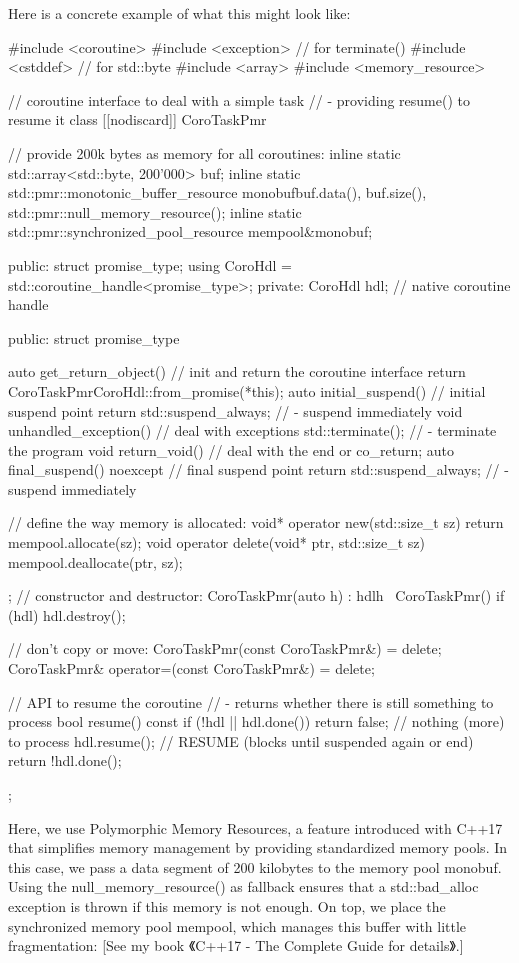 Here is a concrete example of what this might look like:


\begin{cpp}
#include <coroutine>
#include <exception> // for terminate()
#include <cstddef> // for std::byte
#include <array>
#include <memory_resource>

// coroutine interface to deal with a simple task
// - providing resume() to resume it
class [[nodiscard]] CoroTaskPmr {
	// provide 200k bytes as memory for all coroutines:
	inline static std::array<std::byte, 200'000> buf;
	inline static std::pmr::monotonic_buffer_resource
		monobuf{buf.data(), buf.size(), std::pmr::null_memory_resource()};
	inline static std::pmr::synchronized_pool_resource mempool{&monobuf};

public:
	struct promise_type;
	using CoroHdl = std::coroutine_handle<promise_type>;
private:
	CoroHdl hdl; // native coroutine handle
	
public:
	struct promise_type {
		auto get_return_object() { // init and return the coroutine interface
			return CoroTaskPmr{CoroHdl::from_promise(*this)};
		}
		auto initial_suspend() { // initial suspend point
			return std::suspend_always{}; // - suspend immediately
		}
		void unhandled_exception() { // deal with exceptions
			std::terminate(); // - terminate the program
		}
		void return_void() { // deal with the end or co_return;
		}
		auto final_suspend() noexcept { // final suspend point
			return std::suspend_always{}; // - suspend immediately
		}
		
		// define the way memory is allocated:
		void* operator new(std::size_t sz) {
			return mempool.allocate(sz);
		}
		void operator delete(void* ptr, std::size_t sz) {
			mempool.deallocate(ptr, sz);
		}
	};
	// constructor and destructor:
	CoroTaskPmr(auto h) : hdl{h} { }
	~CoroTaskPmr() { if (hdl) hdl.destroy(); }
	
	// don’t copy or move:
	CoroTaskPmr(const CoroTaskPmr&) = delete;
	CoroTaskPmr& operator=(const CoroTaskPmr&) = delete;
	
	// API to resume the coroutine
	// - returns whether there is still something to process
	bool resume() const {
		if (!hdl || hdl.done()) {
			return false; // nothing (more) to process
		}
		hdl.resume(); // RESUME (blocks until suspended again or end)
		return !hdl.done();
	}
};
\end{cpp}

Here, we use Polymorphic Memory Resources, a feature introduced with C++17 that simplifies memory management by providing standardized memory pools. In this case, we pass a data segment of 200 kilobytes to the memory pool monobuf. Using the null\_memory\_resource() as fallback ensures that a std::bad\_alloc exception is thrown if this memory is not enough. On top, we place the synchronized memory pool mempool, which manages this buffer with little fragmentation: [See my book 《C++17 - The Complete Guide for details》.]

